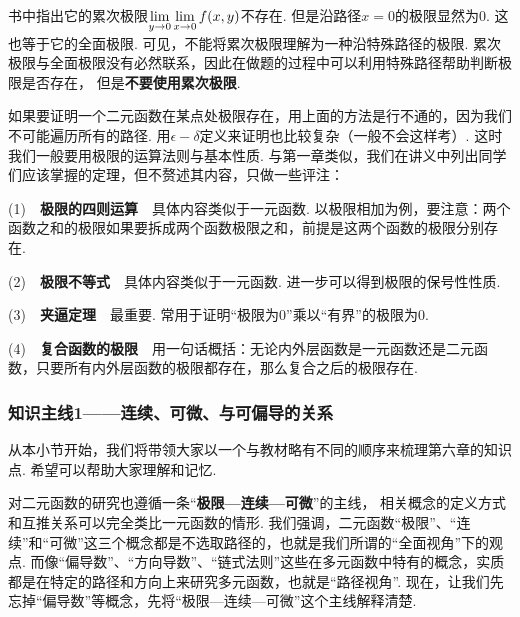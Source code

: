书中指出它的累次极限$\lim\limits_{y \to 0} \limx0 f(x,y)$不存在.
但是沿路径$x=0$的极限显然为$0$.
这也等于它的全面极限.
可见，不能将累次极限理解为一种沿特殊路径的极限.
累次极限与全面极限没有必然联系，因此在做题的过程中可以利用特殊路径帮助判断极限是否存在，
但是\textbf{不要使用累次极限}.\par \vspace{1em}

如果要证明一个二元函数在某点处极限存在，用上面的方法是行不通的，因为我们不可能遍历所有的路径.
用$\epsilon - \delta$定义来证明也比较复杂（一般不会这样考）.
这时我们一般要用极限的运算法则与基本性质.
与第一章类似，我们在讲义中列出同学们应该掌握的定理，但不赘述其内容，只做一些评注：\par \vspace{1em}

(1)~~\textbf{极限的四则运算}~~具体内容类似于一元函数. 以极限相加为例，要注意：两个函数之和的极限如果要拆成两个函数极限之和，前提是这两个函数的极限分别存在.\par
(2)~~\textbf{极限不等式}~~具体内容类似于一元函数. 进一步可以得到极限的保号性性质.\par
(3)~~\textbf{夹逼定理}~~最重要. 常用于证明“极限为$0$”乘以“有界”的极限为$0$.\par
(4)~~\textbf{复合函数的极限}~~用一句话概括：无论内外层函数是一元函数还是二元函数，只要所有内外层函数的极限都存在，那么复合之后的极限存在.\par

\subsubsection{知识主线1——连续、可微、与可偏导的关系} \par
从本小节开始，我们将带领大家以一个与教材略有不同的顺序来梳理第六章的知识点.
希望可以帮助大家理解和记忆.

对二元函数的研究也遵循一条“\textbf{极限—连续—可微}”的主线，
相关概念的定义方式和互推关系可以完全类比一元函数的情形.
我们强调，二元函数“极限”、“连续”和“可微”这三个概念都是不选取路径的，也就是我们所谓的“全面视角”下的观点.
而像“偏导数”、“方向导数”、“链式法则”这些在多元函数中特有的概念，实质都是在特定的路径和方向上来研究多元函数，也就是“路径视角”.
现在，让我们先忘掉“偏导数”等概念，先将“极限—连续—可微”这个主线解释清楚.\par

